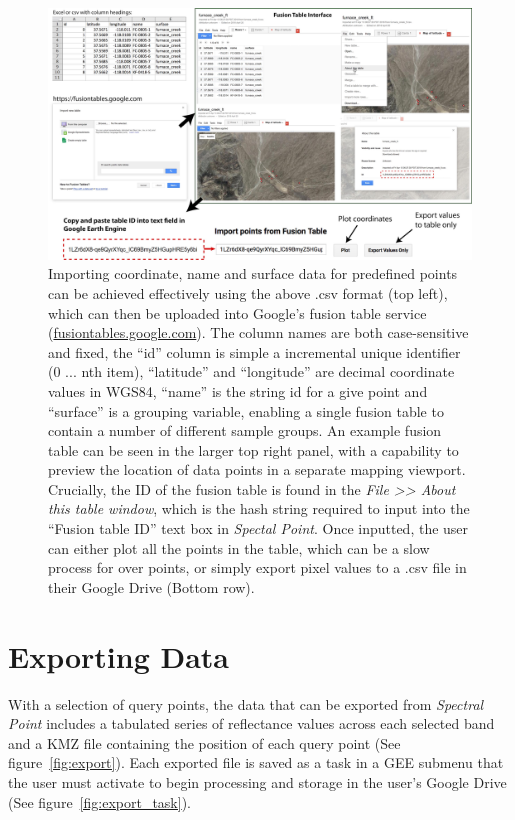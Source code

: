 \documentclass[12pt]{article}
\begin{document}
\begin{landscape}
\begin{figure}
\centering
\includegraphics[width=1.2\textwidth,keepaspectratio]{images/fusion_table_reduced.jpg}
\caption{Importing coordinate, name and surface data for predefined points can be achieved effectively using the above .csv format (top left), which can then be uploaded into Google's fusion table service (\href{https://fusiontables.google.com}{fusiontables.google.com}). The column names are both case-sensitive and fixed, the ``id'' column is simple a incremental unique identifier (0 ... nth item), ``latitude'' and ``longitude'' are decimal coordinate values in WGS84, ``name'' is the string id for a give point and ``surface'' is a grouping variable, enabling a single fusion table to contain a number of different sample groups. An example fusion table can be seen in the larger top right panel, with a capability to preview the location of data points in a separate mapping viewport. Crucially, the ID of the fusion table is found in the \textit{File >> About this table window}, which is the hash string required to input into the ``Fusion table ID'' text box in \textit{Spectal Point}. Once inputted, the user can either plot all the points in the table, which can be a slow process for over points, or simply export pixel values to a .csv file in their Google Drive (Bottom row).}
\label{fig:fusion_table}
\end{figure}
\end{landscape}

\section{Exporting Data}
\label{export-data}
With a selection of query points, the data that can be exported from \textit{Spectral Point} includes a tabulated series of reflectance values across each selected band and a KMZ file containing the position of each query point (See figure~\ref{fig:export}). Each exported file is saved as a task in a GEE submenu that the user must activate to begin processing and storage in the user's Google Drive (See figure~\ref{fig:export_task}).
\end{document}
